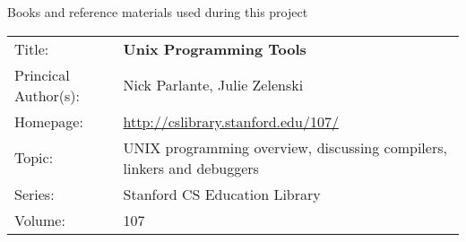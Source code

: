 \documentclass[a4paper,12pt]{article}
\begin{document}
Books and reference materials used during this project

\begin{tabular}{ll}
Title: &	\textbf{Unix Programming Tools}	\\
Princical Author(s): &	Nick Parlante, Julie Zelenski \\
Homepage: &	\url{http://cslibrary.stanford.edu/107/}	\\	
Topic:	&	UNIX programming overview, discussing compilers, linkers and debuggers \\
Series:	&	Stanford CS Education Library	\\
Volume:	&	107 \\
\end{tabular}
\end{document}

